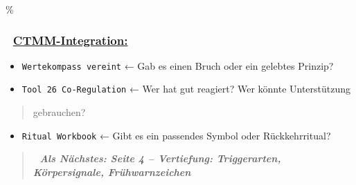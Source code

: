 \hypertarget{ctmm-integration}{\%
\subsubsection{\texorpdfstring{📎 \textbf{\ul{CTMM-Integration:}}}{📎 CTMM-Integration:}}\label{ctmm-integration}}

\begin{itemize}
\tightlist
\item
  \texttt{W}\texttt{erte}\texttt{k}\texttt{ompass}\texttt{\ }\texttt{vereint} ← Gab es einen Bruch oder ein gelebtes Prinzip?
\item
  \texttt{T}\texttt{ool}\texttt{\ }\texttt{26}\texttt{\ C}\texttt{o}\texttt{-R}\texttt{egulation} ← Wer hat gut reagiert? Wer könnte Unterstützung
\end{itemize}

\begin{quote}
gebrauchen?
\end{quote}

\begin{itemize}
\tightlist
\item
  \texttt{R}\texttt{itual}\texttt{\ W}\texttt{orkbook} ← Gibt es ein passendes Symbol oder Rückkehrritual?
\end{itemize}

\begin{quote}
\emph{\textbf{📎 Als Nächstes: Seite 4 -- Vertiefung: Triggerarten, Körpersignale, Frühwarnzeichen}}
\end{quote}
